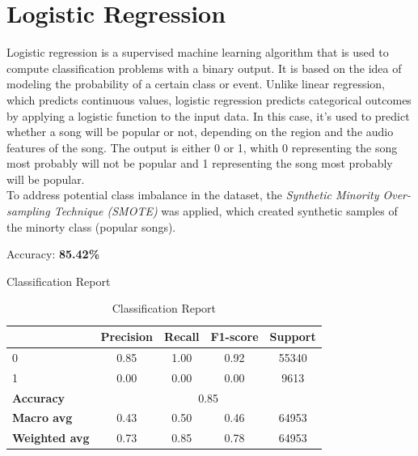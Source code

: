 \newpage


\section{Logistic Regression}
Logistic regression is a supervised machine learning algorithm that is used to
compute classification problems with a binary output.
It is based on the idea of modeling the probability of a certain class or event.
Unlike linear regression, which predicts continuous values, logistic regression predicts categorical outcomes by applying a logistic function to the input data.
In this case, it's used to predict
whether a song will be popular or not, depending on the region and the 
audio features of the song. The output is
either 0 or 1, whith 0 representing the song most probably will not be popular and 
1 representing the song most probably will be popular. \\
To address potential class imbalance in the dataset, the \textit{Synthetic Minority Over-sampling Technique (SMOTE)} was applied, which
    created synthetic samples of the minorty class (popular songs). 


Accuracy: \textbf{85.42\%}


Classification Report
\begin{table}[h]
    \centering
    \begin{tabular}{lcccc}
        \toprule
        & \textbf{Precision} & \textbf{Recall} & \textbf{F1-score} & \textbf{Support} \\
        \midrule
        0 & 0.85 & 1.00 & 0.92 & 55340 \\
        1 & 0.00 & 0.00 & 0.00 & 9613 \\
        \midrule
        \textbf{Accuracy} & \multicolumn{4}{c}{0.85} \\
        \textbf{Macro avg} & 0.43 & 0.50 & 0.46 & 64953 \\
        \textbf{Weighted avg} & 0.73 & 0.85 & 0.78 & 64953 \\
        \bottomrule
    \end{tabular}
    \caption{Classification Report}
    \label{tab:classification_report}
\end{table}

